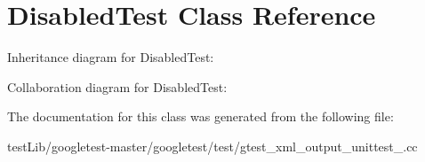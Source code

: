 \hypertarget{classDisabledTest}{}\section{Disabled\+Test Class Reference}
\label{classDisabledTest}


Inheritance diagram for Disabled\+Test\+:


Collaboration diagram for Disabled\+Test\+:


The documentation for this class was generated from the following file\+:\begin{DoxyCompactItemize}
\item 
test\+Lib/googletest-\/master/googletest/test/gtest\+\_\+xml\+\_\+output\+\_\+unittest\+\_\+.\+cc\end{DoxyCompactItemize}
